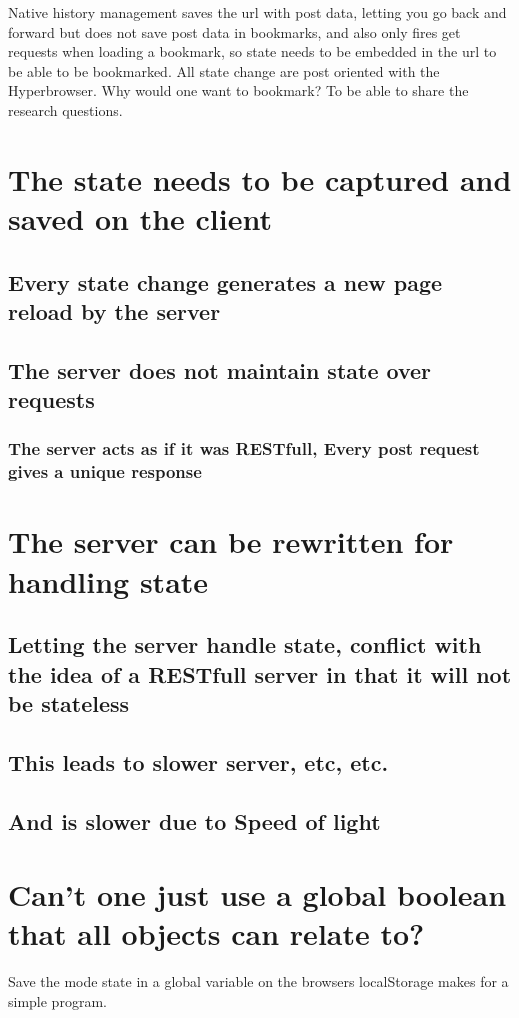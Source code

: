 \documentclass[english]{ifimaster}
\begin{document}
Native history management saves the url with post data, letting you go back and forward but does not save post data in bookmarks, and also only fires get requests when loading a bookmark, so state needs to be embedded in the url to be able to be bookmarked. All state change are post oriented with the Hyperbrowser.  Why would one want to bookmark? To be able to share the research questions.

\section{The state needs to be captured and saved on the client}
\subsection{Every state change generates a new page reload by the server}
\subsection{The server does not maintain state over requests}
\subsubsection{The server acts as if it was RESTfull, Every post request gives a unique response}

\section{The server can be rewritten for handling state}
\subsection{Letting the server handle state, conflict with the idea of a RESTfull server in that it will not be stateless}
\subsection{This leads to slower server, etc, etc.}
\subsection{And is slower due to Speed of light}


\section{Can’t one just use a global boolean that all objects can relate to?}
Save the mode state in a global variable on the browsers localStorage makes for a simple program.
\end{document}
